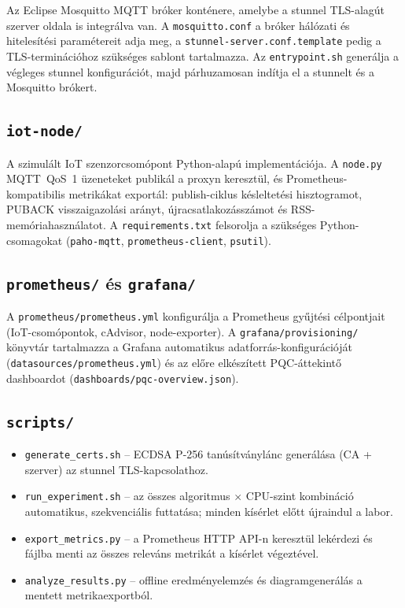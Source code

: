 Az Eclipse Mosquitto MQTT bróker konténere, amelybe a stunnel TLS-alagút szerver oldala is integrálva van. A \texttt{mosquitto.conf} a bróker hálózati és hitelesítési paramétereit adja meg, a \texttt{stunnel-server.conf.template} pedig a TLS-terminációhoz szükséges sablont tartalmazza. Az \texttt{entrypoint.sh} generálja a végleges stunnel konfigurációt, majd párhuzamosan indítja el a stunnelt és a Mosquitto brókert.

\subsection*{\texttt{iot-node/}}

A szimulált IoT szenzorcsomópont Python-alapú implementációja. A \texttt{node.py} MQTT~QoS~1 üzeneteket publikál a proxyn keresztül, és Prometheus-kompatibilis metrikákat exportál: publish-ciklus késleltetési hisztogramot, PUBACK visszaigazolási arányt, újracsatlakozásszámot és RSS-memóriahasználatot. A \texttt{requirements.txt} felsorolja a szükséges Python-csomagokat (\texttt{paho-mqtt}, \texttt{prometheus-client}, \texttt{psutil}).

\subsection*{\texttt{prometheus/} és \texttt{grafana/}}

A \texttt{prometheus/prometheus.yml} konfigurálja a Prometheus gyűjtési célpontjait (IoT-csomópontok, cAdvisor, node-exporter). A \texttt{grafana/provisioning/} könyvtár tartalmazza a Grafana automatikus adatforrás-konfigurációját (\texttt{datasources/prometheus.yml}) és az előre elkészített PQC-áttekintő dashboardot (\texttt{dashboards/pqc-overview.json}).

\subsection*{\texttt{scripts/}}

\begin{itemize}
    \item \texttt{generate\_certs.sh} -- ECDSA P-256 tanúsítványlánc generálása (CA + szerver) az stunnel TLS-kapcsolathoz.
    \item \texttt{run\_experiment.sh} -- az összes algoritmus $\times$ CPU-szint kombináció automatikus, szekvenciális futtatása; minden kísérlet előtt újraindul a labor.
    \item \texttt{export\_metrics.py} -- a Prometheus HTTP API-n keresztül lekérdezi és fájlba menti az összes releváns metrikát a kísérlet végeztével.
    \item \texttt{analyze\_results.py} -- offline eredményelemzés és diagramgenerálás a mentett metrikaexportból.
\end{itemize}
